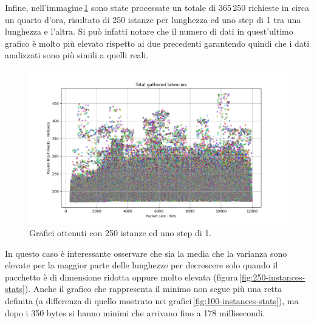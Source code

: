 \FloatBarrier\noindent Infine, nell'immagine\,\ref{fig:250-instances-total} sono state processate un totale di 365\,250 richieste in circa un quarto d'ora, risultato di 250 istanze per lunghezza ed uno step di 1 tra una lunghezza e l'altra. Si può infatti notare che il numero di dati in quest'ultimo grafico è molto più elevato rispetto ai due precedenti garantendo quindi che i dati analizzati sono più simili a quelli reali.
\begin{figure}[h]
    \centering
    \includegraphics[width = .9\textwidth]{hw-2/report/imgs/250-instances/la-total-latencies.png}
    \caption{Grafici ottenuti con 250 istanze ed uno step di 1.}
    \label{fig:250-instances-total}
\end{figure}
In questo caso è interessante osservare che sia la media che la varianza sono elevate per la maggior parte delle lunghezze per decrescere solo quando il pacchetto è di dimensione ridotta oppure molto elevata (figura\,\ref{fig:250-instances-stats}). Anche il grafico che rappresenta il minimo non segue più una retta definita (a differenza di quello mostrato nei grafici\,\ref{fig:100-instances-stats}), ma dopo i 350 bytes si hanno minimi che arrivano fino a 178 millisecondi.
